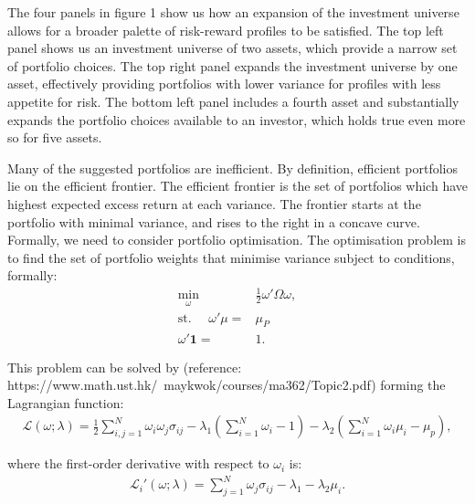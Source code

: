 \documentclass[11pt,a4paper,oneside]{article}
\newcommand{\lll}{\mathcal{L}}
\newcommand{\lp}{\left(}
\newcommand{\rp}{\right)}
\begin{document}
The four panels in figure 1 show us how an expansion of the investment universe allows for a broader palette of risk-reward profiles to be satisfied. The top left panel shows us an investment universe of two assets, which provide a narrow set of portfolio choices. The top right panel expands the investment universe by one asset, effectively providing portfolios with lower variance for profiles with less appetite for risk. The bottom left panel includes a fourth asset and substantially expands the portfolio choices available to an investor, which holds true even more so for five assets.

Many of the suggested portfolios are inefficient. By definition, efficient portfolios lie on the efficient frontier. The efficient frontier is the set of portfolios which have highest expected excess return at each variance. The frontier starts at the portfolio with minimal variance, and rises to the right in a concave curve. Formally, we need to consider portfolio optimisation. The optimisation problem is to find the set of portfolio weights that minimise variance subject to conditions, formally:
\begin{align}
    \min_\omega \ & \frac{1}{2} \omega'\Omega\omega,\\
    \text{st. }\quad \omega'\mu =& \mu_P \\
        \omega'\mathbf{1} =& 1.
\end{align}

This problem can be solved by (reference: https://www.math.ust.hk/~maykwok/courses/ma362/Topic2.pdf) forming the Lagrangian function:
\begin{align}
    \lll\lp \omega; \lambda\rp = \frac{1}{2}\sum_{i,j=1}^N \omega_i \omega_j \sigma_{ij} - \lambda_1\lp \sum_{i=1}^N\omega_i - 1\rp - \lambda_2 \lp \sum_{i=1}^N \omega_i \mu_i - \mu_p\rp,
\end{align}

where the first-order derivative with respect to $\omega_i$ is:
\begin{align}
    \lll_i'\lp \omega;\lambda\rp = \sum_{j=1}^N\omega_j\sigma_{ij} - \lambda_1 - \lambda_2 \mu_i.
\end{align}
\end{document}
